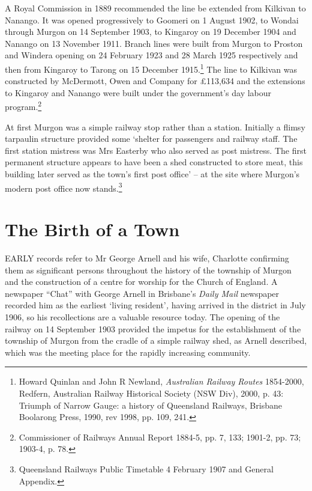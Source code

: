 A Royal Commission in 1889 recommended the line be extended from Kilkivan to Nanango. It was opened progressively to Goomeri on 1 August 1902, to Wondai through Murgon on 14 September 1903, to Kingaroy on 19 December 1904 and Nanango on 13 November 1911. Branch lines were built from Murgon to Proston and Windera opening on 24 February 1923 and 28 March 1925 respectively and then from Kingaroy to Tarong on 15 December 1915.\footnote{Howard Quinlan and John R Newland, \emph{Australian Railway Routes} 1854-2000, Redfern, Australian Railway Historical Society (NSW Div), 2000, p. 43: Triumph of Narrow Gauge: a history of Queensland Railways, Brisbane Boolarong Press, 1990, rev 1998, pp. 109, 241.} The line to Kilkivan was constructed by McDermott, Owen and Company for \pounds113,634 and the extensions to Kingaroy and Nanango were built under the government's day labour program.\footnote{Commissioner of Railways Annual Report 1884-5, pp. 7, 133; 1901-2, pp. 73; 1903-4, p. 78.}


At first Murgon was a simple railway stop rather than a station. Initially a flimsy tarpaulin structure provided some `shelter for passengers and railway staff. The first station mistress was Mrs Easterby who also served as post mistress. The first permanent structure appears to have been a shed constructed to store meat, this building later served as the town's first post office' -- at the site where Murgon's modern post office now stands.\footnote{Queensland Railways Public Timetable 4 February 1907 and General Appendix.}


\balance


\printendnotes[custom]
\setcounter{endnote}{0}
\chapter{The Birth of a Town}
\nobalance


\lettrine[lines=3]{E}{ARLY}
 records refer to Mr George Arnell and his wife, Charlotte confirming them as significant persons throughout the history of the township of Murgon and the construction of a centre for worship for the Church of England. A newspaper ``Chat'' with George Arnell in Brisbane's \emph{Daily Mail} newspaper recorded him as the earliest `living resident'\emph{,} having arrived in the district in July 1906, so his recollections are a valuable resource today. The opening of the railway on 14 September 1903 provided the impetus for the establishment of the township of Murgon from the cradle of a simple railway shed, as Arnell described, which was the meeting place for the rapidly increasing community.

